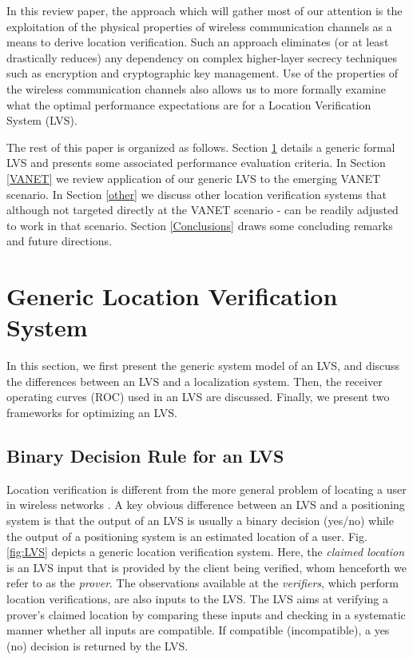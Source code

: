 \documentclass[journal]{IEEEtran}
\begin{document}
In this review paper, the approach which will gather most of our attention is the exploitation of the physical properties of wireless communication channels as a means to derive location verification. Such an approach eliminates (or at least drastically reduces) any dependency on complex higher-layer secrecy techniques such as encryption and cryptographic key management. Use of the   properties of the wireless communication channels also allows us to more formally examine what  the optimal performance expectations are for a Location Verification System (LVS).




The rest of this paper is organized as follows. Section
\ref{LVS} details a generic formal LVS and presents some associated performance evaluation criteria. In Section \ref{VANET} we review application of our generic  LVS  to the emerging VANET scenario.  In Section \ref{other} we discuss  other location verification systems that although not targeted directly at the VANET scenario - can be readily adjusted to work in that scenario. Section \ref{Conclusions} draws some concluding remarks and future directions.

\section{Generic Location Verification System}\label{LVS}

In this section, we first present the generic system model of an LVS, and discuss the differences between an LVS and a localization system. Then, the receiver operating curves (ROC) used in an LVS are discussed. Finally, we present two frameworks for optimizing an LVS.

\subsection{Binary Decision Rule for an LVS}\label{LVS_decision_rule}

Location verification is different from the more general problem of locating a user in wireless networks \cite{malaney2007wireless}. A key obvious difference between an LVS and a positioning system is that the output of an LVS is usually a binary decision (yes/no) while the output of a positioning system is an estimated location of a user. Fig. \ref{fig:LVS} depicts a generic location verification system. Here, the \emph{claimed location} is an LVS input that is provided by the client being verified, whom henceforth we refer to as the \emph{prover}. The observations available at the \emph{verifiers}, which perform location verifications, are also  inputs to the LVS.  The LVS aims at verifying a prover's claimed location by comparing these inputs and checking in a systematic manner whether all inputs are compatible. If compatible (incompatible), a yes (no) decision is returned by the LVS.
\end{document}
